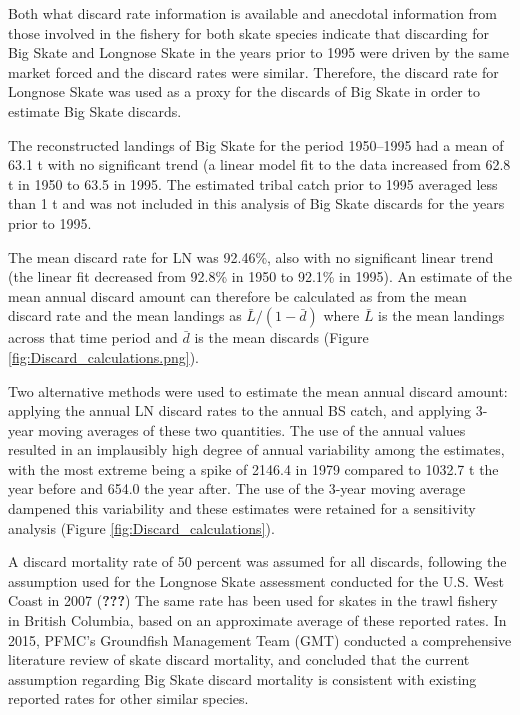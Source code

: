 \documentclass[12pt,]{article}
\begin{document}
Both what discard rate information is available and anecdotal
information from those involved in the fishery for both skate species
indicate that discarding for Big Skate and Longnose Skate in the years
prior to 1995 were driven by the same market forced and the discard
rates were similar. Therefore, the discard rate for Longnose Skate was
used as a proxy for the discards of Big Skate in order to estimate Big
Skate discards.

The reconstructed landings of Big Skate for the period 1950--1995 had a
mean of 63.1 t with no significant trend (a linear model fit to the data
increased from 62.8 t in 1950 to 63.5 in 1995. The estimated tribal
catch prior to 1995 averaged less than 1 t and was not included in this
analysis of Big Skate discards for the years prior to 1995.

The mean discard rate for LN was 92.46\%, also with no significant
linear trend (the linear fit decreased from 92.8\% in 1950 to 92.1\% in
1995). An estimate of the mean annual discard amount can therefore be
calculated as from the mean discard rate and the mean landings as
\(\bar{L} / (1 - \bar{d})\) where \(\bar{L}\) is the mean landings
across that time period and \(\bar{d}\) is the mean discards (Figure
\ref{fig:Discard_calculations.png}).

Two alternative methods were used to estimate the mean annual discard
amount: applying the annual LN discard rates to the annual BS catch, and
applying 3-year moving averages of these two quantities. The use of the
annual values resulted in an implausibly high degree of annual
variability among the estimates, with the most extreme being a spike of
2146.4 in 1979 compared to 1032.7 t the year before and 654.0 the year
after. The use of the 3-year moving average dampened this variability
and these estimates were retained for a sensitivity analysis (Figure
\ref{fig:Discard_calculations}).

A discard mortality rate of 50 percent was assumed for all discards,
following the assumption used for the Longnose Skate assessment
conducted for the U.S. West Coast in 2007 ({\textbf{???}}) The same rate
has been used for skates in the trawl fishery in British Columbia, based
on an approximate average of these reported rates. In 2015, PFMC's
Groundfish Management Team (GMT) conducted a comprehensive literature
review of skate discard mortality, and concluded that the current
assumption regarding Big Skate discard mortality is consistent with
existing reported rates for other similar species.
\end{document}
